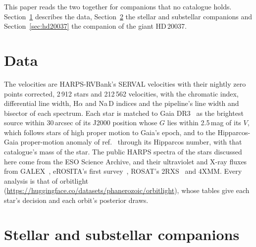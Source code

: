 \documentclass[3p,11pt]{elsarticle}
\begin{document}
This paper reads the two together for companions that no catalogue holds. Section~\ref{sec:data}
describes the data, Section~\ref{sec:stellar} the stellar and substellar companions and
Section~\ref{sec:hd20037} the companion of the giant HD\,20037.

\section{Data}\label{sec:data}

The velocities are HARPS-RVBank's SERVAL velocities with their nightly zero points corrected,
2\,912 stars and 212\,562 velocities, with the chromatic index, differential line width,
H$\alpha$ and Na\,D indices and the pipeline's line width and bisector of each spectrum. Each
star is matched to Gaia DR3~\cite{GaiaNSS2023} as the brightest source within 30\,arcsec of its
J2000 position whose $G$ lies within 2.5\,mag of its $V$, which follows stars of high proper
motion to Gaia's epoch, and to the Hipparcos-Gaia proper-motion anomaly of
ref.~\cite{Kervella2022} through its Hipparcos number, with that catalogue's mass of the star. The
public HARPS spectra of the stars discussed here come from the ESO Science Archive, and their
ultraviolet and X-ray fluxes from GALEX~\cite{Bianchi2017}, eROSITA's first
survey~\cite{Merloni2024}, ROSAT's 2RXS~\cite{Boller2016} and 4XMM. Every analysis is that of
orbitlight (\url{https://huggingface.co/datasets/phanerozoic/orbitlight}), whose tables give each
star's decision and each orbit's posterior draws.

\section{Stellar and substellar companions}\label{sec:stellar}
\end{document}

